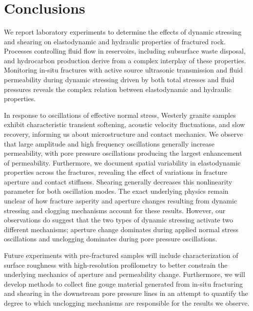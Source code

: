 \documentclass[letterpaper,10pt]{article}
\begin{document}
	
	\section{Conclusions}
	\paragraph{}
	We  report laboratory experiments to determine the effects of dynamic stressing and shearing on elastodynamic and hydraulic properties of fractured rock. Processes controlling fluid flow in reservoirs, including subsurface waste disposal, and hydrocarbon production derive from a complex interplay of these properties. Monitoring in-situ fractures with active source ultrasonic transmission and fluid permeability during dynamic stressing driven by both total stresses and fluid pressures reveals the complex relation between elastodynamic and hydraulic properties. 
	
	In response to oscillations of effective normal stress, Westerly granite samples exhibit characteristic transient softening, acoustic velocity fluctuations, and slow recovery, informing us about microstructure and contact mechanics. We observe that large amplitude and high frequency oscillations generally increase permeability, with pore pressure oscillations producing the largest enhancement of permeability. Furthermore, we document spatial variability in elastodynamic properties across the fractures, revealing the effect of variations in fracture aperture and contact stiffness. Shearing generally decreases this nonlinearity parameter for both oscillation modes.
	The exact underlying physics remain unclear of how fracture asperity and aperture changes resulting from dynamic stressing and clogging mechanisms account for these results. However, our observations do suggest that the two types of dynamic stressing activate two different mechanisms; aperture change dominates during applied normal stress oscillations and unclogging dominates during pore pressure oscillations. 
	
	Future experiments with pre-fractured samples will include characterization of surface roughness with high-resolution profilometry to better constrain the underlying mechanics of aperture and permeability change. Furthermore, we will develop methods to collect fine gouge material generated from in-situ fracturing and shearing in the downstream pore pressure lines in an attempt to quantify the degree to which unclogging mechanisms are responsible for the results we observe.
	\clearpage
	
\end{document}
